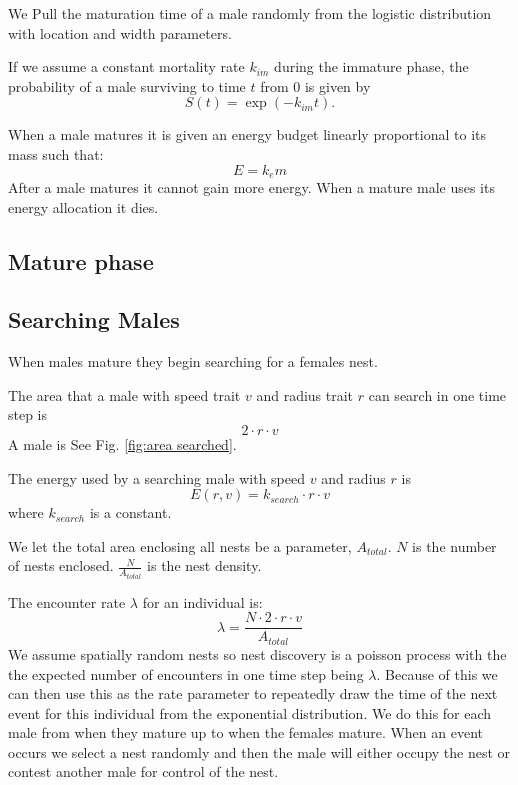 \documentclass[a4paper,11pt]{article}
\begin{document}

We Pull the maturation time of a male randomly from the logistic distribution with location and width parameters.

If we assume a constant mortality rate $k_{im}$ during the immature phase, the probability of a male surviving to time $t$ from $0$ is given by
\begin{equation} \label{eq:surv_immature}
    S(t) = \exp(-k_{im} t).
\end{equation}

When a male matures it is given an energy budget linearly proportional to its mass such that: 
$$ E = k_em$$
After a male matures it cannot gain more energy. When a mature male uses its energy allocation it dies.

\subsection{Mature phase}
\subsection{Searching Males}
When males mature they begin searching for a females nest.


The area that a male with speed trait $v$ and radius trait $r$ can search in one time step is
\begin{equation}
    2 \cdot r \cdot v
\end{equation}
A male is 
See Fig. \ref{fig:area searched}.

The energy used by a searching male with speed $v$ and radius $r$ is 
\begin{equation}
    E(r,v) = k_{search} \cdot r \cdot v
\end{equation}
where $k_{search}$ is a constant.  %

We let the total area enclosing all nests be a parameter, $A_{total}$.
$N$ is the number of nests enclosed. $\frac{N}{A_{total}}$ is the nest density.

The encounter rate $\lambda$ for an individual is:
\begin{equation} \label{eq:encounter rate}
    \lambda = \frac {N \cdot 2 \cdot r \cdot v} {A_{total}}
\end{equation}
\citep{Gurarie2012}
We assume spatially random nests so nest discovery is a poisson process with the the expected number of encounters in one time step being $\lambda$.
Because of this we can then use this as the rate parameter to repeatedly draw the time of the next event for this individual from the exponential distribution.
We do this for each male from when they mature up to when the females mature.
When an event occurs we select a nest randomly and then the male will either occupy the nest or contest another male for control of the nest.
\end{document}
